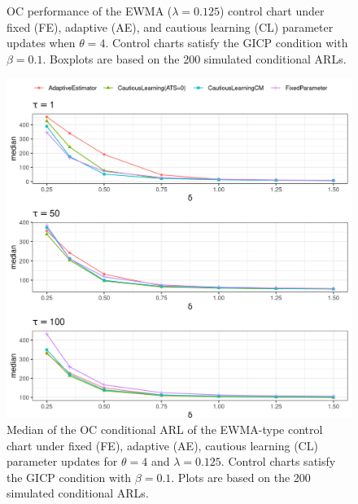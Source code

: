 \begin{figure}
\begin{subfigure}{0.49\textwidth}
\end{subfigure}
  \caption{OC performance of the EWMA ($ \lambda = 0.125$) control chart under fixed (FE), adaptive (AE), and cautious learning (CL) parameter updates when $ \theta = 4$.
    Control charts satisfy the GICP condition  with $ \beta = 0.1$.
  Boxplots are based on the 200 simulated conditional ARLs.}
  \label{fig:lambda=0.125/EWMA OC theta=4}
\end{figure}

\begin{figure}
  \includegraphics[width=\textwidth]{img/sims/theta=4.0_signedEWMA(l = 0.125, upw = true, L = 1.0)/OC-profiles.png}
  \caption{Median of the OC conditional ARL of the EWMA-type control chart under fixed (FE), adaptive (AE), cautious learning (CL) parameter updates for $ \theta = 4$ and $ \lambda = 0.125$.
    Control charts satisfy the GICP condition  with $ \beta = 0.1$.
  Plots are based on the 200 simulated conditional ARLs.}
  \label{fig:lambda=0.05/EWMA OC profiles}
\end{figure}


